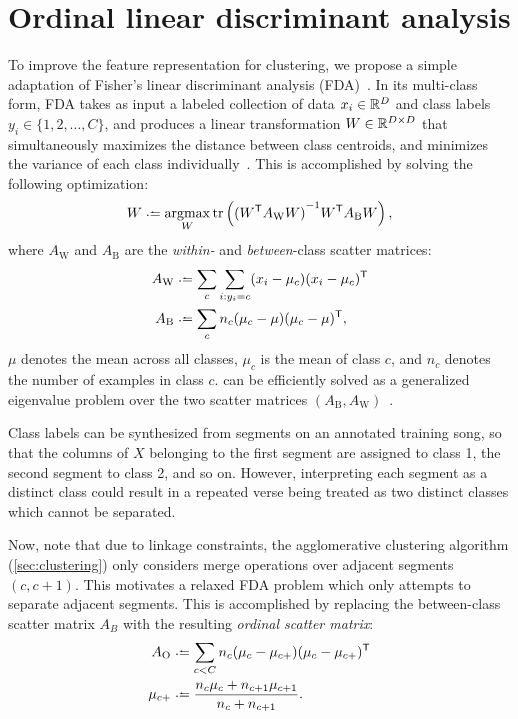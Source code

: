\documentclass{article}
\begin{document}
\section{Ordinal linear discriminant analysis}
\label{sec:olda}
To improve the feature representation for clustering, we propose a simple adaptation of Fisher's linear discriminant
analysis (FDA)~\cite{fisher1936use}.  In its multi-class form, FDA takes as input a labeled collection of data $x_i \in \mathbb{R}^D$
and class labels $y_i \in \{1,2,\ldots, C\}$, and produces a linear transformation $W \in \mathbb{R}^{D\times D}$ that simultaneously 
maximizes the distance between class centroids, and minimizes the variance of each class 
individually~\cite{fukunaga1990introduction}. This is accomplished by solving the following optimization:
\begin{equation}
W \defeq \argmax_W \trace\left( {(W\trans A_\text{W} W)}^{-1} W\trans A_\text{B} W \right) \label{eq:fda},
\end{equation}
where $A_\text{W}$ and $A_\text{B}$ are the \emph{within-} and \emph{between}-class scatter matrices:
\begin{align*}
A_\text{W} & \defeq \sum_c \sum_{i : y_i = c} (x_i - \mu_c)(x_i - \mu_c)\trans\\
A_\text{B} & \defeq \sum_c n_c (\mu_c - \mu)(\mu_c - \mu)\trans,
\end{align*}
$\mu$ denotes the mean across all classes, $\mu_c$ is the mean of class $c$, and $n_c$ denotes the number of examples in class $c$.
 can be efficiently solved as a generalized eigenvalue problem over the two scatter matrices $(A_\text{B},
A_\text{W})$~\cite{de2005eigenproblems}.

Class labels can be synthesized from segments on an annotated training song, so that the columns of $X$ belonging to the first 
segment are assigned to class 1, the second segment to class 2, and so on.
However, interpreting each segment as a distinct class could result in a repeated verse being treated as two distinct classes which 
cannot be separated.  

Now, note that due to linkage constraints, the agglomerative clustering algorithm (\cref{sec:clustering}) only considers merge 
operations over adjacent segments $(c, c+1)$. This motivates a relaxed FDA problem which only attempts to separate adjacent
segments.  This is accomplished by replacing the between-class scatter matrix $A_B$ with the resulting \emph{ordinal scatter matrix}:
\begin{align*}
A_\text{O} &\defeq \sum_{c < C} n_c (\mu_c - \mu_{c+}) (\mu_c - \mu_{c+})\trans\\
\mu_{c+} &\defeq \frac{n_c \mu_c + n_{c+1} \mu_{c+1} }{n_c + n_{c+1}}.
\end{align*}
\end{document}

